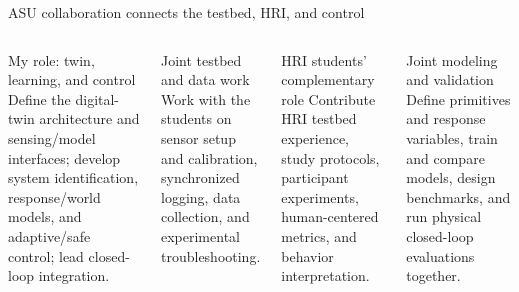 \documentclass[aspectratio=169,11pt]{beamer}
\begin{document}
\begin{frame}{ASU collaboration connects the testbed, HRI, and control}
\begin{columns}[T,onlytextwidth]
\begin{block}{My role: twin, learning, and control}
Define the digital-twin architecture and sensing/model interfaces; develop system identification, response/world models, and adaptive/safe control; lead closed-loop integration.
\end{block}
\begin{block}{Joint testbed and data work}
Work with the students on sensor setup and calibration, synchronized logging, data collection, and experimental troubleshooting.
\end{block}
\begin{block}{HRI students' complementary role}
Contribute HRI testbed experience, study protocols, participant experiments, human-centered metrics, and behavior interpretation.
\end{block}
\begin{block}{Joint modeling and validation}
Define primitives and response variables, train and compare models, design benchmarks, and run physical closed-loop evaluations together.
\end{block}
\end{columns}
\end{frame}
\end{document}
